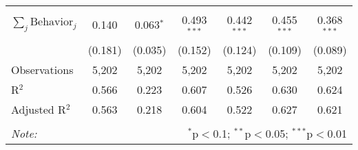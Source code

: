 \begin{tabular}{@{\extracolsep{1pt}}lcccccc}
\hline \\[-1.8ex] 
$\sum_j \mathrm{Behavior}_j$ & 0.140 & 0.063$^{*}$ & 0.493$^{***}$ & 0.442$^{***}$ & 0.455$^{***}$ & 0.368$^{***}$ \\ 
 & (0.181) & (0.035) & (0.152) & (0.124) & (0.109) & (0.089) \\ 
Observations & 5,202 & 5,202 & 5,202 & 5,202 & 5,202 & 5,202 \\ 
R$^{2}$ & 0.566 & 0.223 & 0.607 & 0.526 & 0.630 & 0.624 \\ 
Adjusted R$^{2}$ & 0.563 & 0.218 & 0.604 & 0.522 & 0.627 & 0.621 \\ 
\hline 
\hline \\[-1.8ex] 
\textit{Note:}  & \multicolumn{6}{r}{$^{*}$p$<$0.1; $^{**}$p$<$0.05; $^{***}$p$<$0.01} \\ 
\end{tabular} 